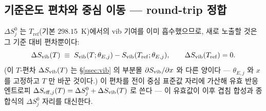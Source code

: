 \subsection{기준온도 편차와 중심 이동 --- round-trip 정합}\label{ssec:einstein-roundtrip}
$\Delta S^0_j$ 는 $T_\mathrm{ref}$(기본 $298.15$~K)에서의 vib 기여를 이미 흡수했으므로, 새로 노출할 것은 그
기준 대비 편차뿐이다:
\begin{equation}
\Delta S_{\mathrm{vib}}(T) \;\equiv\; S_{\mathrm{vib}}(T;\theta_{E,j})-S_{\mathrm{vib}}(T_\mathrm{ref};\theta_{E,j}),
\qquad \Delta S_{\mathrm{vib}}(T_\mathrm{ref})=0.
\label{eq:dSvib}
\end{equation}
(이 $T$-편차 $\Delta S_{\mathrm{vib}}(T)$ 는 \S\ref{ssec:vib} 의 부분몰 $\partial S_{\mathrm{vib}}/\partial x$ 와 다른 양이다 ---
$\theta_{E,j}$ 와 $x$ 를 고정하고 $T$ 만 바꾼 것이다.) 이 편차를 전이 중심 표준값 자리에 가산해 유효 반응
엔트로피 $\Delta S_{\mathrm{eff},j}(T)=\Delta S^0_j+\Delta S_{\mathrm{vib}}(T)$ 로 쓴다 --- 이 유효값이 이후 겹침 합성과
종합식의 $\Delta S^0_j$ 자리를 대신한다.

